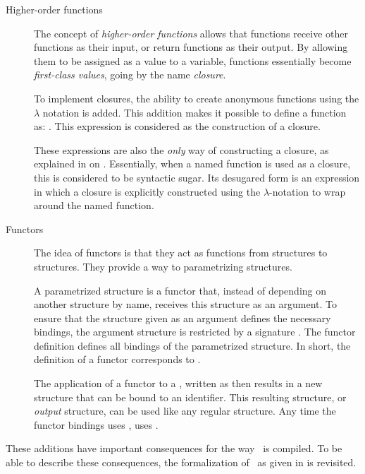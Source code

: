 \begin{description}
\item[Higher-order functions]
The concept of \emph{higher-order functions} allows that functions receive other functions as their input, or return functions as their output.
By allowing them to be assigned as a value to a variable, functions essentially become \emph{first-class values}, going by the name \emph{closure}.

To implement closures, the ability to create anonymous functions using the $\lambda$ notation is added.
This addition makes it possible to define a function as: .
This expression is considered as the construction of a closure.

These expressions are also the \emph{only} way of constructing a closure, as explained in  on . 
Essentially, when a named function is used as a closure, this is considered to be syntactic sugar.
Its desugared form is an expression in which a closure is explicitly constructed using the $\lambda$-notation to wrap around the named function.

\item[Functors]
The idea of functors is that they act as functions from structures to structures.
They provide a way to parametrizing structures.

A parametrized structure is a functor  that, instead of depending on another structure  by name, receives this structure as an argument.
To ensure that the structure given as an argument defines the necessary bindings, the argument structure is restricted by a signature .
The functor definition defines all bindings of the parametrized structure.
In short, the definition of a functor corresponds to .

The application of a functor  to a , written as  then results in a new structure  that can be bound to an identifier.
This resulting structure, or \emph{output} structure, can be used like any regular structure. Any time the functor bindings uses ,  uses .
\end{description}

These additions have important consequences for the way \MiniML\ is compiled.
To be able to describe these consequences, the formalization of \MiniML\ as given in  is revisited.

